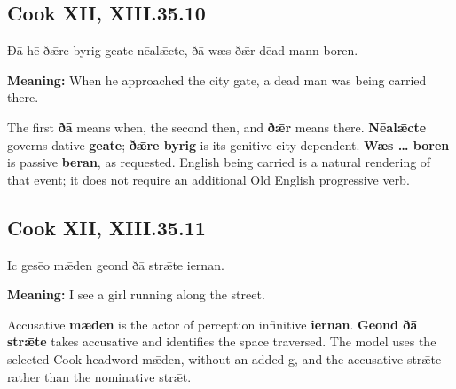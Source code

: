 \par\begin{minipage}{\linewidth}\raggedright
\subsection*{Cook XII, XIII.35.10}

Ðā hē ðǣre byrig geate nēalǣcte, ðā wæs ðǣr dēad mann boren.

\textbf{Meaning:} When he approached the city gate, a dead man was being carried there.

The first \textbf{ðā} means when, the second then, and \textbf{ðǣr} means there. \textbf{Nēalǣcte} governs dative \textbf{geate}; \textbf{ðǣre byrig} is its genitive city dependent. \textbf{Wæs … boren} is passive \textbf{beran}, as requested. English being carried is a natural rendering of that event; it does not require an additional Old English progressive verb.

\end{minipage}\par\addvspace{4pt}

\par\begin{minipage}{\linewidth}\raggedright
\subsection*{Cook XII, XIII.35.11}

Ic gesēo mǣden geond ðā strǣte iernan.

\textbf{Meaning:} I see a girl running along the street.

Accusative \textbf{mǣden} is the actor of perception infinitive \textbf{iernan}. \textbf{Geond ðā strǣte} takes accusative and identifies the space traversed. The model uses the selected Cook headword mǣden, without an added g, and the accusative strǣte rather than the nominative strǣt.

\end{minipage}\par\addvspace{4pt}

